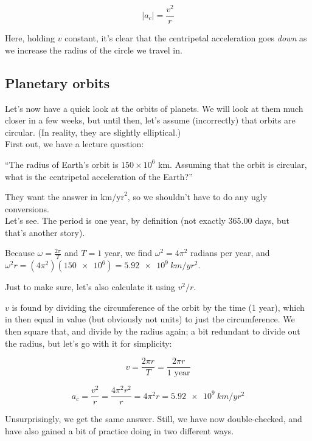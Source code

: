 \begin{equation}
|a_c| = \frac{v^2}{r}
\end{equation}

Here, holding $v$ constant, it's clear that the centripetal acceleration goes \emph{down} as we increase the radius of the circle we travel in.


\subsection{Planetary orbits}

Let's now have a quick look at the orbits of planets. We will look at them much closer in a few weeks, but until then, let's assume (incorrectly) that orbits are circular. (In reality, they are slightly elliptical.)\\
First out, we have a lecture question:

``The radius of Earth's orbit is $150 \times 10^6$ km. Assuming that the orbit is circular, what is the centripetal acceleration of the Earth?''

They want the answer in $\text{km/yr}^2$, so we shouldn't have to do any ugly conversions.\\
Let's see. The period is one year, by definition (not exactly 365.00 days, but that's another story).

Because $\omega = \frac{2\pi}{T}$ and $T = 1$ year, we find $\omega^2 = 4\pi^2$ radians per year, and $\omega^2 r = (4 \pi^2)(\num{150e6}) = \SI{5.92e9}{km/yr^2}$.

Just to make sure, let's also calculate it using $v^2/r$.

$v$ is found by dividing the circumference of the orbit by the time (1 year), which in then equal in value (but obviously not units) to just the circumference. We then square that, and divide by the radius again; a bit redundant to divide out the radius, but let's go with it for simplicity:

\begin{equation}
v = \frac{2 \pi r}{T} = \frac{2 \pi r}{1 \text{ year}}
\end{equation}

\begin{equation}
a_c = \frac{v^2}{r} = \frac{4 \pi^2 r^2}{r} = 4 \pi^2 r = \SI{5.92e9}{km/yr^2}
\end{equation}

Unsurprisingly, we get the same answer. Still, we have now double-checked, and have also gained a bit of practice doing in two different ways.

